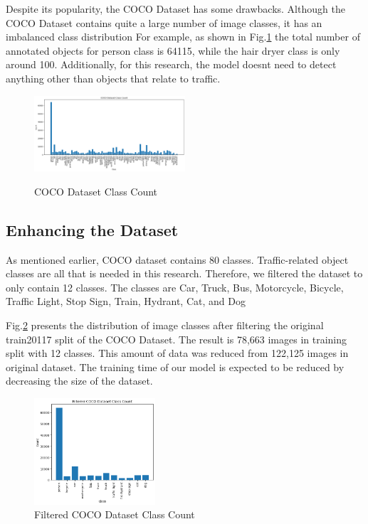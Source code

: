 \documentclass[conference]{IEEEtran}
\begin{document}
Despite its popularity, the COCO Dataset has some drawbacks. 
Although the COCO Dataset contains quite a large number of image classes, it has an imbalanced class distribution 
For example, as shown in Fig.\ref{fig:original_coco_classes_count} the total number of annotated objects for person class is 64115, while the hair dryer class is only around 100. Additionally, for this research, the model doesnt need to detect anything other than objects that relate to traffic.
\begin{figure}[!h]
\centering
\includegraphics[width=0.5\textwidth,keepaspectratio]{coco_class_count.png}\label{fig:original_coco_classes_count}
\caption{COCO Dataset Class Count}
\end{figure}


\subsection{Enhancing the Dataset}\label{Filtering}
As mentioned earlier, COCO dataset contains 80 classes. Traffic-related object classes are all that is needed in this research.
Therefore, we filtered the dataset to only contain 12 classes. The classes are
Car, Truck, Bus, Motorcycle, Bicycle, Traffic Light, Stop Sign, Train, Hydrant, Cat, and Dog

Fig.\ref{fig:COCOFiltered} presents the distribution of image classes after filtering the original train20117 split of the COCO Dataset.
The result is 78,663 images in training split with 12 classes.
This amount of data was reduced from 122,125 images in original dataset. 
The training time of our model is expected to be reduced by decreasing the size of the dataset.
\begin{figure}[h!]
\centering
\includegraphics[width=0.4\textwidth]{filtered_coco_class_count.png}
\caption{Filtered COCO Dataset Class Count}
\label{fig:COCOFiltered}
\end{figure}
\end{document}

